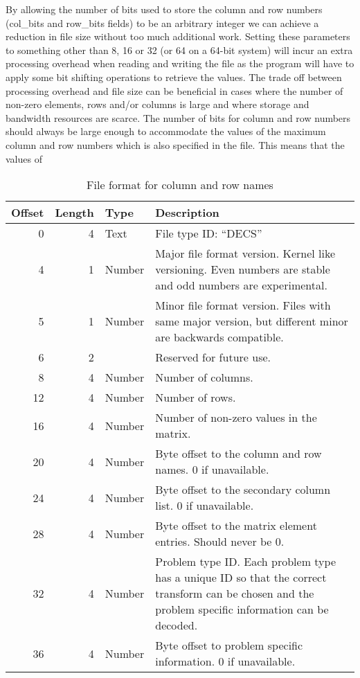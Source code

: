 By allowing the number of bits used to store the column and row numbers (col\_bits and row\_bits fields) to be an arbitrary integer we can achieve a reduction in file size without too much additional work.
Setting these parameters to something other than 8, 16 or 32 (or 64 on a 64-bit system) will incur an extra processing overhead when reading and writing the file as the program will have to apply some bit shifting operations to retrieve the values.
The trade off between processing overhead and file size can be beneficial in cases where the number of non-zero elements, rows and/or columns is large and where storage and bandwidth resources are scarce.
The number of bits for column and row numbers should always be large enough to accommodate the values of the maximum column and row numbers which is also specified in the file.
This means that the values of 


\begin{table}[htbp]
	\centering
	\begin{tabular}{|r|r|l|p{2.7in}|}
		\hline
		\bf Offset & \bf Length & \bf Type & \bf Description \\ \hline
		0  & 4 & Text   & File type ID: ``DECS'' \\ \hline
		4  & 1 & Number & Major file format version. Kernel like versioning. Even numbers are stable and odd numbers are experimental. \\ \hline
		5  & 1 & Number & Minor file format version. Files with same major version, but different minor are backwards compatible. \\ \hline
		6  & 2 &        & Reserved for future use. \\ \hline
		8  & 4 & Number & Number of columns. \\ \hline
		12 & 4 & Number & Number of rows. \\ \hline
		16 & 4 & Number & Number of non-zero values in the matrix. \\ \hline
		20 & 4 & Number & Byte offset to the column and row names. 0 if unavailable. \\ \hline
		24 & 4 & Number & Byte offset to the secondary column list. 0 if unavailable. \\ \hline
		28 & 4 & Number & Byte offset to the matrix element entries. Should never be 0. \\ \hline
		32 & 4 & Number & Problem type ID. Each problem type has a unique ID so that the correct transform can be chosen and the problem specific information can be decoded. \\ \hline
		36 & 4 & Number & Byte offset to problem specific information. 0 if unavailable. \\ \hline
	\end{tabular}
	\caption{File format for column and row names}
	\label{tab:header}
\end{table}




